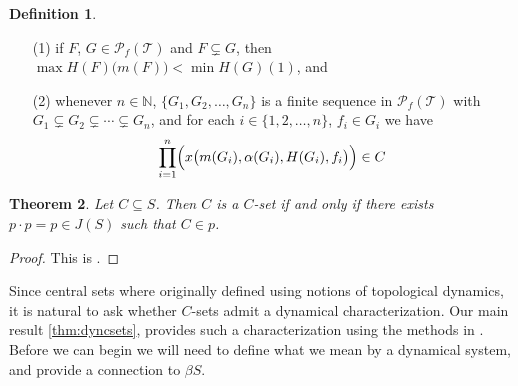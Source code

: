 \documentclass[12pt]{article}
\theoremstyle{plain}
\newtheorem{thm}{Theorem}[section]
\theoremstyle{definition}
\newtheorem{defn}[thm]{Definition}
\newcommand{\bbN}{\mathbb{N}}
\begin{document}
\begin{defn}
\begin{itemize}
          \begin{itemize}
            \item[(1)] if $F$, $G \in \mathcal{P}_f(\mathcal{T})$ and $F
              \subsetneq G$, then $\max H(F)\bigl(m(F)\bigr) < \min
              H(G)(1)$, and
           \item[(2)] whenever $n \in \bbN$, $\{ G_1, G_2, \ldots, G_n
              \}$ is a finite sequence in $\mathcal{P}_f(\mathcal{T})$
              with $G_1 \subsetneq G_2 \subsetneq \cdots \subsetneq G_n$,
              and for each $i \in \{1, 2, \ldots, n\}$, $f_i \in G_i$ we
              have
              \[
              \prod_{i=1}^n\Bigl(x\bigl(m(G_i), \alpha(G_i), H(G_i),
              f_i\bigr)\Bigr) \in C
             \]
      \end{itemize}
    \end{itemize}
  \end{defn}

  \begin{thm}
    \label{thm:csetid}
    Let $C \subseteq S$. 
    Then $C$ is a $C$-set if and only if there exists $p\cdot p = p
    \in J(S)$ such that $C \in p$.
  \end{thm}
  \begin{proof}
    This is \cite[Theorem 3.8]{De:2008uq}.%
  \end{proof}

Since central sets where originally defined using notions of
topological dynamics, it is natural to ask whether $C$-sets
admit a dynamical characterization.
Our main result \ref{thm:dyncsets}, provides such a characterization
using the methods in \cite{Burns:2007uq}.
Before we can begin we will need to define what we mean by a dynamical
system, and provide a connection to $\beta S$.
\end{document}
